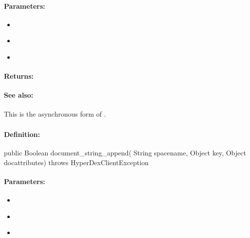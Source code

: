 \paragraph{Parameters:}
\begin{itemize}[noitemsep]
\item {}\\

\item {}\\

\item {}\\

\end{itemize}

\paragraph{Returns:}


\paragraph{See also:}  This is the asynchronous form of .

\pagebreak
\subsubsection{}
\label{api:java:document_string_append}


\paragraph{Definition:}
\begin{javacode}
public Boolean document_string_append(
        String spacename,
        Object key,
        Object docattributes) throws HyperDexClientException
\end{javacode}

\paragraph{Parameters:}
\begin{itemize}[noitemsep]
\item {}\\

\item {}\\

\item {}\\

\end{itemize}

